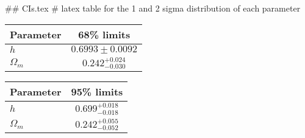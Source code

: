 ## CIs.tex
# latex table for the 1 and 2 sigma distribution of each parameter

\begin{tabular} { l  c}
 Parameter &  68\% limits\\
\hline
{\boldmath$h              $} & $0.6993\pm 0.0092          $\\
{\boldmath$\Omega_m       $} & $0.242^{+0.024}_{-0.030}   $\\
\hline
\end{tabular}

\begin{tabular} { l  c}
 Parameter &  95\% limits\\
\hline
{\boldmath$h              $} & $0.699^{+0.018}_{-0.018}   $\\
{\boldmath$\Omega_m       $} & $0.242^{+0.055}_{-0.052}   $\\
\hline
\end{tabular}
